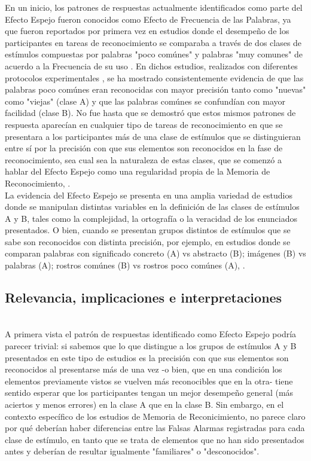En un inicio, los patrones de respuestas actualmente identificados como parte del Efecto Espejo fueron conocidos como Efecto de Frecuencia de las Palabras, ya que fueron reportados por primera vez en estudios donde el desempeño de los participantes en tareas de reconocimiento se comparaba a través de dos clases de estímulos compuestas por palabras "poco comúnes" y palabras "muy comunes" de acuerdo a la Frecuencia de su uso \parencite{Kucera1967}. En dichos estudios, realizados con diferentes protocolos experimentales \parencite{Glanzer1976, Bowles1983, Glanzer1990}, se ha mostrado consistentemente evidencia de que las palabras poco comúnes eran reconocidas con mayor precisión tanto como "nuevas" como "viejas" (clase A) y que las palabras comúnes se confundían con mayor facilidad (clase B). No fue hasta que se demostró que estos mismos patrones de respuesta aparecían en cualquier tipo de tareas de reconocimiento en que se presentara a los participantes más de una clase de estímulos que se distinguieran entre sí por la precisión con que sus elementos son reconocidos en la fase de reconocimiento, sea cual sea la naturaleza de estas clases, que se comenzó a hablar del Efecto Espejo como una regularidad propia de la Memoria de Reconocimiento, \parencite{Glanzer1993}.\\

La evidencia del Efecto Espejo se presenta en una amplia variedad de estudios donde se manipulan distintas variables en la definición de las clases de estímulos A y B,  tales como la complejidad, la ortografía o la veracidad de los enunciados presentados. O bien, cuando se presentan grupos distintos de estímulos que se sabe son reconocidos con distinta precisión, por ejemplo, en estudios donde se comparan palabras con significado concreto (A) vs abstracto (B); imágenes (B) vs palabras (A); rostros comúnes (B) vs rostros poco comúnes (A), \parencite{Glanzer1993, Greene1996, Glanzer1998}.\\

\subsection{Relevancia, implicaciones e interpretaciones}\\

A primera vista el patrón de respuestas identificado como Efecto Espejo podría parecer trivial: si sabemos que lo que distingue a los grupos de estímulos A y B presentados en este tipo de estudios es la precisión con que sus elementos son reconocidos al presentarse más de una vez -o bien, que en una condición los elementos previamente vistos se vuelven más reconocibles que en la otra- tiene sentido esperar que los participantes tengan un mejor desempeño general (más aciertos y menos errores) en la clase A que en la clase B. Sin embargo, en el contexto específico de los estudios de Memoria de Reconicimiento, no parece claro por qué deberían haber diferencias entre las Falsas Alarmas registradas para cada clase de estímulo, en tanto que se trata de elementos que no han sido presentados antes y deberían de resultar igualmente "familiares" o "desconocidos".\\

